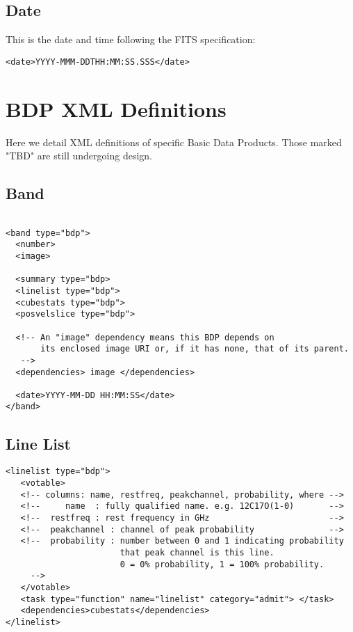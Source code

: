 \documentclass{article}
\begin{document}
%

\subsection{Date}
This is the date and time following the FITS specification:
\footnotesize
\begin{verbatim}
<date>YYYY-MMM-DDTHH:MM:SS.SSS</date>
\end{verbatim}
\normalsize

\newpage
\section{BDP XML Definitions}
Here we detail XML definitions of specific Basic Data Products.
Those marked "TBD" are still undergoing design.

\subsection{Band}
\footnotesize
\begin{verbatim}

<band type="bdp">
  <number>
  <image>

  <summary type="bdp>
  <linelist type="bdp">
  <cubestats type="bdp">
  <posvelslice type="bdp">

  <!-- An "image" dependency means this BDP depends on 
       its enclosed image URI or, if it has none, that of its parent.
   -->
  <dependencies> image </dependencies>

  <date>YYYY-MM-DD HH:MM:SS</date>
</band>

\end{verbatim}
\normalsize

\subsection{Line List}
\footnotesize
\begin{verbatim}
<linelist type="bdp">
   <votable>
   <!-- columns: name, restfreq, peakchannel, probability, where -->
   <!--     name  : fully qualified name. e.g. 12C17O(1-0)       -->
   <!--  restfreq : rest frequency in GHz                        -->
   <!--  peakchannel : channel of peak probability               -->
   <!--  probability : number between 0 and 1 indicating probability
                       that peak channel is this line. 
                       0 = 0% probability, 1 = 100% probability.
     -->
   </votable>
   <task type="function" name="linelist" category="admit"> </task>
   <dependencies>cubestats</dependencies>
</linelist>

\end{verbatim}
\normalsize
\end{document}
